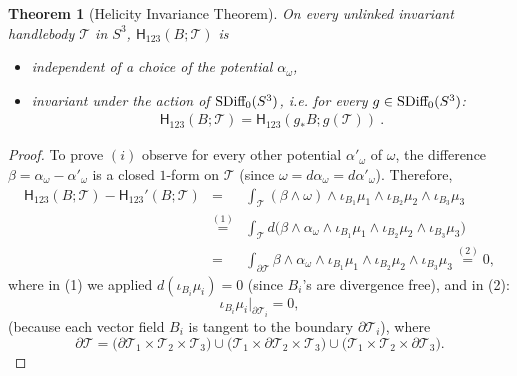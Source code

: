 \documentclass[12pt]{article}
\numberwithin{equation}{section}
\newtheorem{theorem}{Theorem}[section]
\begin{document}
\begin{theorem}[Helicity Invariance Theorem]\label{th:invariance-th}
 On every unlinked invariant handlebody $\mathcal{T}$ in $S^3$, $\mathsf{H}_{123}(B;\mathcal{T})$  is 
 \begin{itemize}
 \item[(i)] independent of a choice of the potential $\alpha_\omega$,
 \item[(ii)] invariant under the action of $\text{\rm SDiff}_0(S^3)$, i.e. for every $g\in \text{\rm SDiff}_0(S^3)$:
\begin{gather}\label{eq:invariance}
 \mathsf{H}_{123}(B;\mathcal{T})=\mathsf{H}_{123}(g_\ast B;g(\mathcal{T}))\ .
\end{gather}
 \end{itemize}
\end{theorem}
\begin{proof}
To prove $(i)$ observe for every other potential $\alpha'_\omega$ of $\omega$, the difference $\beta=\alpha_\omega-\alpha'_\omega$ is a closed $1$-form on $\mathcal{T}$ (since $\omega=d\alpha_\omega=d\alpha'_\omega$). Therefore,
\begin{eqnarray*}
 \mathsf{H}_{123}(B;\mathcal{T})-\mathsf{H}_{123}'(B;\mathcal{T}) & = & \int_{\mathcal{T}} (\beta\wedge\omega)\wedge\iota_{B_1}\mu_1\wedge \iota_{B_2}\mu_2\wedge \iota_{B_3}\mu_3\\
 & \stackrel{(1)}{=} & \int_{\mathcal{T}} d\bigl(\beta\wedge \alpha_\omega\wedge\iota_{B_1}\mu_1\wedge \iota_{B_2}\mu_2\wedge \iota_{B_3}\mu_3\bigr)\\
 & = & \int_{\partial\mathcal{T}} \beta\wedge \alpha_\omega\wedge\iota_{B_1}\mu_1\wedge \iota_{B_2}\mu_2\wedge \iota_{B_3}\mu_3 \stackrel{(2)}{=} 0,
\end{eqnarray*}
where in (1) we applied $d(\iota_{B_i}\mu_i)=0$ (since $B_i$'s are divergence free), and 
in (2):
\[
 \iota_{B_i}\mu_i\bigl|_{\partial\mathcal{T}_i}=0,
\]
(because each vector field $B_i$ is tangent to the boundary $\partial \mathcal{T}_i$), where
\[
 \partial \mathcal{T}=\bigl(\partial \mathcal{T}_1\times \mathcal{T}_2\times \mathcal{T}_3\bigr)\cup \bigl(\mathcal{T}_1\times \partial\mathcal{T}_2\times \mathcal{T}_3\bigr)\cup \bigl(\mathcal{T}_1\times \mathcal{T}_2\times \partial\mathcal{T}_3\bigr).
\]


\end{proof}
\end{document}
